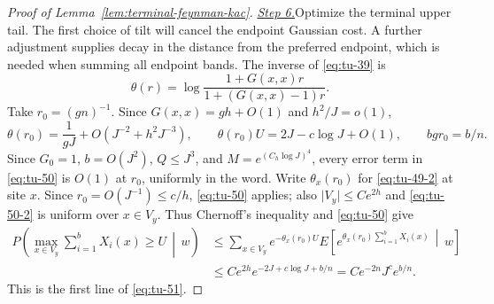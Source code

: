 \begin{proof}[Proof of Lemma~\ref{lem:terminal-feynman-kac}]
\smallskip\noindent
\underline{\textit{Step 6.}}\quad Optimize the terminal upper tail.
The first choice of tilt will cancel the endpoint Gaussian cost. A further
adjustment supplies decay in the distance from the preferred endpoint,
which is needed when summing all endpoint bands. The inverse of \eqref{eq:tu-39} is
\begin{equation}
       \theta(r)=
       \log\frac{1+G(x,x)r}{1+(G(x,x)-1)r}.                   \tag{49}\label{eq:tu-49-2}
\end{equation}
Take \(r_0=(gn)^{-1}\).  Since
\(G(x,x)=gh+O(1)\) and \(h^2/J=o(1)\),
\begin{equation}
 \theta(r_0)=\frac1{gJ}+O(J^{-2}+h^2J^{-3}),\qquad
 \theta(r_0)U=2J-c\log J+O(1),\qquad bg r_0=b/n.              \tag{50}\label{eq:tu-50-2}
\end{equation}
Since \(G_0=1\), \(b=O(J^2)\), \(Q\le J^3\), and
\(M=e^{(C_h\log J)^4}\), every error term in \eqref{eq:tu-50}
is \(O(1)\) at \(r_0\), uniformly in the word.
Write \(\theta_x(r_0)\) for \eqref{eq:tu-49-2} at site \(x\).
Since \(r_0=O(J^{-1})\le c/h\), \eqref{eq:tu-50} applies; also
\(\lvert V_y\rvert\le Ce^{2h}\) and \eqref{eq:tu-50-2} is uniform over
\(x\in V_y\).  Thus
Chernoff's inequality and \eqref{eq:tu-50} give
\[
\begin{aligned}
 P\left(\max_{x\in V_y}\sum_{i=1}^bX_i(x)\ge U\,\middle|\,w\right)
 &\le\sum_{x\in V_y}e^{-\theta_x(r_0)U}
   E\left[e^{\theta_x(r_0)\sum_{i=1}^bX_i(x)}\,\middle|\,w\right]\\
 &\le Ce^{2h}e^{-2J+c\log J+b/n}
   =Ce^{-2n}J^c e^{b/n}.
\end{aligned}
\]
This is the first line of \eqref{eq:tu-51}.


\end{proof}
